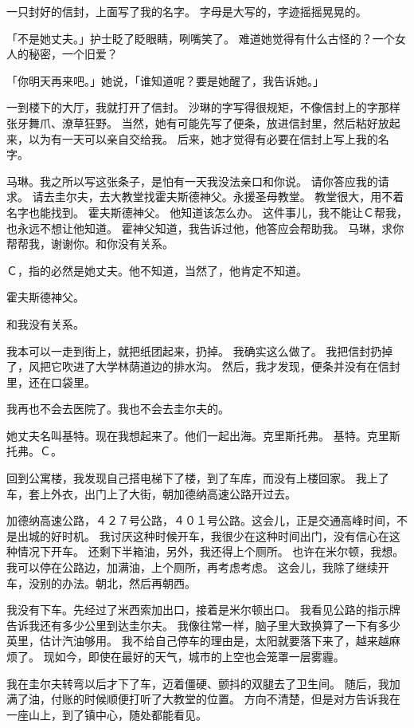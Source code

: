 \documentclass[UTF8]{ctexart}
\begin{document}
一只封好的信封，上面写了我的名字。
字母是大写的，字迹摇摇晃晃的。

「不是她丈夫。」护士眨了眨眼睛，咧嘴笑了。
难道她觉得有什么古怪的？一个女人的秘密，一个旧爱？

「你明天再来吧。」她说，「谁知道呢？要是她醒了，我告诉她。」

一到楼下的大厅，我就打开了信封。
沙琳的字写得很规矩，不像信封上的字那样张牙舞爪、潦草狂野。
当然，她有可能先写了便条，放进信封里，然后粘好放起来，以为有一天可以亲自交给我。
后来，她才觉得有必要在信封上写上我的名字。

马琳。我之所以写这张条子，是怕有一天我没法亲口和你说。
请你答应我的请求。
请去圭尔夫，去大教堂找霍夫斯德神父。永援圣母教堂。
教堂很大，用不着名字也能找到。
霍夫斯德神父。
他知道该怎么办。
这件事儿，我不能让Ｃ帮我，也永远不想让他知道。
霍神父知道，我告诉过他，他答应会帮助我。
马琳，求你帮帮我，谢谢你。和你没有关系。

Ｃ，指的必然是她丈夫。他不知道，当然了，他肯定不知道。

霍夫斯德神父。

和我没有关系。

我本可以一走到街上，就把纸团起来，扔掉。
我确实这么做了。
我把信封扔掉了，风把它吹进了大学林荫道边的排水沟。
然后，我才发现，便条并没有在信封里，还在口袋里。

我再也不会去医院了。我也不会去圭尔夫的。

她丈夫名叫基特。现在我想起来了。他们一起出海。克里斯托弗。
基特。克里斯托弗。Ｃ。

回到公寓楼，我发现自己搭电梯下了楼，到了车库，而没有上楼回家。
我上了车，套上外衣，出门上了大街，朝加德纳高速公路开过去。

加德纳高速公路，４２７号公路，４０１号公路。这会儿，正是交通高峰时间，不是出城的好时机。
我讨厌这种时候开车，我很少在这种时间出门，没有信心在这种情况下开车。
还剩下半箱油，另外，我还得上个厕所。
也许在米尔顿，我想。我可以停在公路边，加满油，上个厕所，再考虑考虑。
这会儿，我除了继续开车，没别的办法。朝北，然后再朝西。

我没有下车。先经过了米西索加出口，接着是米尔顿出口。
我看见公路的指示牌告诉我还有多少公里到达圭尔夫。
我像往常一样，脑子里大致换算了一下有多少英里，估计汽油够用。
我不给自己停车的理由是，太阳就要落下来了，越来越麻烦了。
现如今，即使在最好的天气，城市的上空也会笼罩一层雾霾。


我在圭尔夫转弯以后才下了车，迈着僵硬、颤抖的双腿去了卫生间。
随后，我加满了油，付账的时候顺便打听了大教堂的位置。
方向不清楚，但是对方告诉我在一座山上，到了镇中心，随处都能看见。
\end{document}
